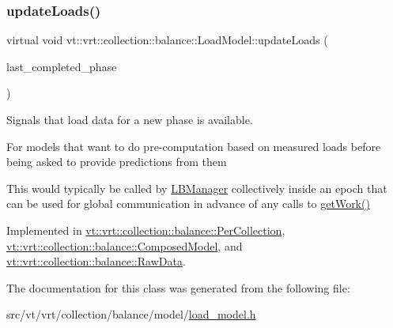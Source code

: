\subsubsection{\texorpdfstring{update\+Loads()}{updateLoads()}}
{\footnotesize\ttfamily virtual void vt\+::vrt\+::collection\+::balance\+::\+Load\+Model\+::update\+Loads (\begin{DoxyParamCaption}\item[{\hyperlink{namespacevt_a46ce6733d5cdbd735d561b7b4029f6d7}{Phase\+Type}}]{last\+\_\+completed\+\_\+phase }\end{DoxyParamCaption})\hspace{0.3cm}{\ttfamily [pure virtual]}}



Signals that load data for a new phase is available. 

For models that want to do pre-\/computation based on measured loads before being asked to provide predictions from them

This would typically be called by \hyperlink{structvt_1_1vrt_1_1collection_1_1balance_1_1_l_b_manager}{L\+B\+Manager} collectively inside an epoch that can be used for global communication in advance of any calls to \hyperlink{classvt_1_1vrt_1_1collection_1_1balance_1_1_load_model_ab51ce15ff1ff1341ba921555d4d57159}{get\+Work()} 

Implemented in \hyperlink{structvt_1_1vrt_1_1collection_1_1balance_1_1_per_collection_a2b41fbbe2b684654f8dbfd9207b77501}{vt\+::vrt\+::collection\+::balance\+::\+Per\+Collection}, \hyperlink{classvt_1_1vrt_1_1collection_1_1balance_1_1_composed_model_ad8108b4392d63b7f09e443920a64933a}{vt\+::vrt\+::collection\+::balance\+::\+Composed\+Model}, and \hyperlink{structvt_1_1vrt_1_1collection_1_1balance_1_1_raw_data_a4aaae24a53ead0248b873911ce560a34}{vt\+::vrt\+::collection\+::balance\+::\+Raw\+Data}.



The documentation for this class was generated from the following file\+:\begin{DoxyCompactItemize}
\item 
src/vt/vrt/collection/balance/model/\hyperlink{load__model_8h}{load\+\_\+model.\+h}\end{DoxyCompactItemize}
